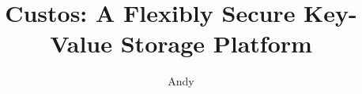 \documentclass[defaultstyle,11pt]{thesis}
\title{Custos: A Flexibly Secure Key-Value Storage Platform}
\author{Andy}{Sayler}
\begin{document}








\nocite{*}		        %

\appendix
\singlespacing


\end{document}
